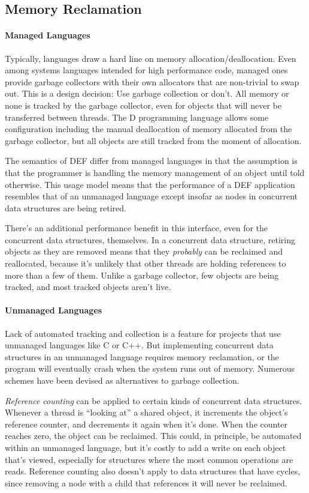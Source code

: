 \subsection{Memory Reclamation}

\paragraph{Managed Languages} Typically, languages draw a hard line on memory allocation/deallocation.  Even among systems languages intended for high performance code, managed ones provide garbage collectors with their own allocators that are non-trivial to swap out.\cite{Go}\cite{DotNetGC}\cite{D}  This is a design decision: Use garbage collection or don't.  All memory or none is tracked by the garbage collector, even for objects that will never be transferred between threads.  The D programming language allows some configuration including the manual deallocation of memory allocated from the garbage collector, but all objects are still tracked from the moment of allocation.\cite{DPhobos}

The semantics of DEF differ from managed languages in that the assumption is that the programmer is handling the memory management of an object until told otherwise.  This usage model means that the performance of a DEF application resembles that of an unmanaged language except insofar as nodes in concurrent data structures are being retired.

There's an additional performance benefit in this interface, even for the concurrent data structures, themselves.  In a concurrent data structure, retiring objects as they are removed means that they \textit{probably} can be reclaimed and reallocated, because it's unlikely that other threads are holding references to more than a few of them.  Unlike a garbage collector, few objects are being tracked, and most tracked objects aren't live.

\paragraph{Unmanaged Languages} Lack of automated tracking and collection is a feature for projects that use unmanaged languages like C or C++.  But implementing concurrent data structures in an unmanaged language requires memory reclamation, or the program will eventually crash when the system runs out of memory.  Numerous schemes have been devised as alternatives to garbage collection.  

\textit{Reference counting} can be applied to certain kinds of concurrent data structures\cite{DMMS}\cite{GPST09}.  Whenever a thread is ``looking at'' a shared object, it increments the object's reference counter, and decrements it again when it's done.  When the counter reaches zero, the object can be reclaimed.  This could, in principle, be automated within an unmanaged language, but it's costly to add a write on each object that's viewed, especially for structures where the most common operations are reads.  Reference counting also doesn't apply to data structures that have cycles, since removing a node with a child that references it will never be reclaimed.

